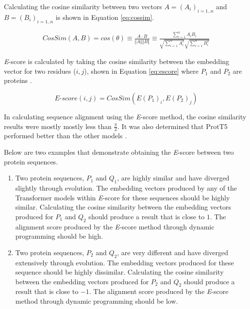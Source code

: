 Calculating the cosine similarity between two vectors \(A = (A_i)_{i=1..n}\) and \(B = (B_i)_{i=1..n}\) is shown in Equation \ref{eq:cossim}.

\begin{equation}
    \begin{aligned}
        CosSim(A, B) = cos(\theta) \equiv \frac{A \cdot B}{\Vert A \Vert \Vert B \Vert} %
        \equiv \frac{\sum\limits_{i=1}^{n} A_iB_i}{\sqrt{\sum\limits_{i=1}^{n} A_i^2}\sqrt{\sum\limits_{i=1}^{n} B_i^2}}
    \end{aligned}
	\label{eq:cossim}
\end{equation}

\textit{E}-score is calculated by taking the cosine similarity between the embedding vector for two \glspl{residue} (\(i, j\)), shown in Equation \ref{eq:escore} where \(P_1\) and \(P_2\) are proteins \cite{Ashrafzadeh:2023}.

\begin{equation}
    \textit{E}\mbox{-}score(i,j) = CosSim(E(P_1)_i, E(P_2)_j)
    \label{eq:escore}
\end{equation}

In calculating sequence alignment using the \textit{E}-score method, the cosine similarity results were mostly  mostly less than \(\frac{\pi}{2}\). It was also determined that ProtT5 performed better than the other models \cite{Ashrafzadeh:2023}.

Below are two examples that demonstrate obtaining the \textit{E}-score between two protein sequences. 
\begin{enumerate}
    \item{Two protein sequences, \(P_1\) and \(Q_1\), are highly similar and have diverged slightly through evolution. The embedding vectors produced by any of the Transformer models within \textit{E}-score for these sequences should be highly similar. Calculating the cosine similarity between the embedding vectors produced for \(P_1\) and \(Q_2\) should produce a result that is close to \(1\). The alignment score produced by the \textit{E}-score method through dynamic programming should be high.}
    \item{Two protein sequences, \(P_2\) and \(Q_2\), are very different and have diverged extensively through evolution. The embedding vectors produced for these sequence should be highly dissimilar. Calculating the cosine similarity between the embedding vectors produced for \(P_2\) and \(Q_2\) should produce a result that is close to \(-1\). The alignment score produced by the \textit{E}-score method through dynamic programming should be low.}
\end{enumerate}

